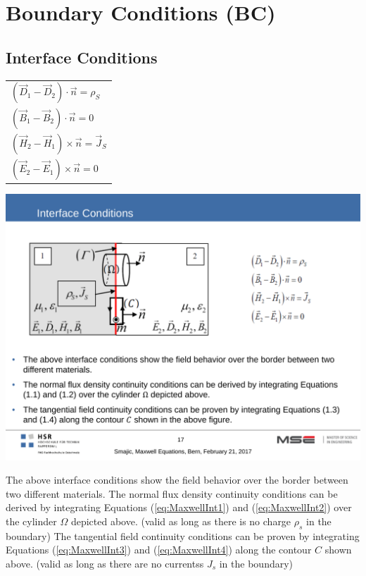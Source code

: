 \section{Boundary Conditions (BC)}
\subsection{Interface Conditions}
\begin{minipage}[rt]{8cm}
	\begin{tabular}{l}
		\(\displaystyle \left(\vec{D}_1 - \vec{D}_2\right) \cdot \vec{n} = \rho_S\) \\
		\(\displaystyle\left(\vec{B}_1 - \vec{B}_2\right) \cdot \vec{n} = 0\)\\
		\(\displaystyle\left(\vec{H}_2 - \vec{H}_1\right) \times \vec{n} =\vec{J}_S\) \\
		\(\displaystyle\left(\vec{E}_2 - \vec{E}_1\right) \times \vec{n} = 0\)\\
	\end{tabular}
\end{minipage}
\begin{minipage}[lt]{11cm}
	\includegraphics[width=.6\textwidth]{./images/InterfaceConditions.pdf}\\
\end{minipage}
The above interface conditions show the field behavior over the border between two different materials. \newline
The normal flux density continuity conditions can be derived by integrating Equations (\ref{eq:MaxwellInt1}) and (\ref{eq:MaxwellInt2}) over the cylinder $\Omega$ depicted above. (valid as long as there is no charge $\rho_s$ in the boundary) \newline
The tangential field continuity conditions can be proven by integrating Equations (\ref{eq:MaxwellInt3}) and (\ref{eq:MaxwellInt4}) along the contour $C$ shown above. (valid as long as there are no currentss $J_s$ in the boundary)